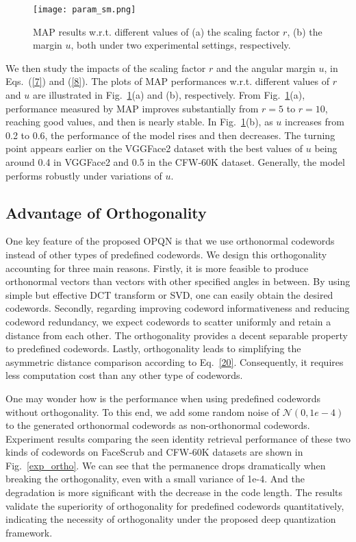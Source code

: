\documentclass{elsarticle}
\begin{document}
\begin{figure}[htbp]
	\centering
	\texttt{[image: param\_sm.png]}
	\caption{MAP results w.r.t. different values of (a) the scaling factor $r$, (b) the margin $u$, both under two experimental settings, respectively.}
	\label{param_sm}
\end{figure}
We then study the impacts of the scaling factor $r$ and the angular margin $u$, in Eqs.~(\ref{7}) and (\ref{8}). The plots of MAP performances w.r.t. different values of $r$ and $u$ are illustrated in Fig.~\ref{param_sm}(a) and (b), respectively. From Fig.~\ref{param_sm}(a), performance measured by MAP improves substantially from $r=5$ to $r=10$, reaching good values, and then is nearly stable. In Fig.~\ref{param_sm}(b), as $u$ increases from 0.2 to 0.6, the performance of the model rises and then decreases. The turning point appears earlier on the VGGFace2 dataset with the best values of $u$ being around 0.4 in VGGFace2 and 0.5 in the CFW-60K dataset. Generally, the model performs robustly under variations of $u$. 

\subsection{Advantage of Orthogonality}
One key feature of the proposed OPQN is that we use orthonormal codewords instead of other types of predefined codewords. We design this orthogonality accounting for three main reasons. Firstly, it is more feasible to produce orthonormal vectors than vectors with other specified angles in between. By using simple but effective DCT transform or SVD, one can easily obtain the desired codewords. Secondly, regarding improving codeword informativeness and reducing codeword redundancy, we expect codewords to scatter uniformly and retain a distance from each other. The orthogonality provides a decent separable property to predefined codewords. Lastly, orthogonality leads to simplifying the asymmetric distance comparison according to Eq.~\ref{20}. Consequently, it requires less computation cost than any other type of codewords. 

One may wonder how is the performance when using predefined codewords without orthogonality. To this end, we add some random noise of $\mathcal{N}(0, 1e-4)$ to the generated orthonormal codewords as non-orthonormal codewords. Experiment results comparing the seen identity retrieval performance of these two kinds of codewords on FaceScrub and CFW-60K datasets are shown in Fig.~\ref{exp_ortho}. We can see that the permanence drops dramatically when breaking the orthogonality, even with a small variance of 1e-4. And the degradation is more significant with the decrease in the code length. The results validate the superiority of orthogonality for predefined codewords quantitatively, indicating the necessity of orthogonality under the proposed deep quantization framework. 
\end{document}
